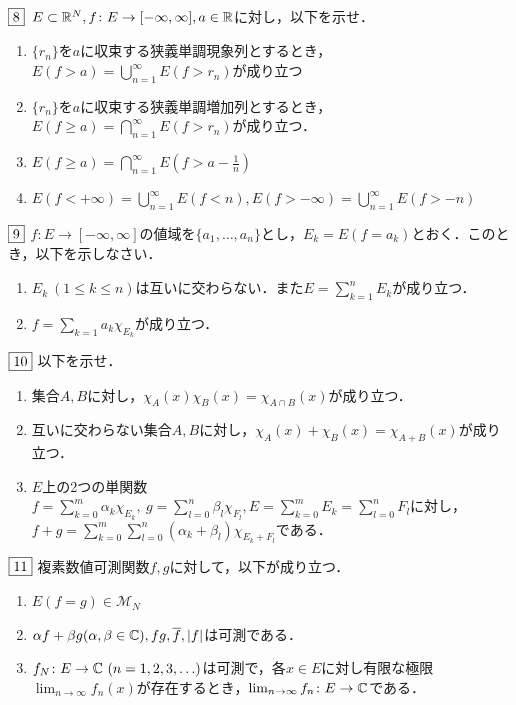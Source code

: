 \documentclass[dvipdfmx, leqno]{jsreport}
\begin{document}
\begin{tcolorbox}$\fbox{8}$
    $E\subset \mathbb{R}^N, f\colon E\to [-\infty, \infty], a\in \mathbb{R}$に対し，以下を示せ．
\begin{enumerate}
    \item $\{r_n\}$を$a$に収束する狭義単調現象列とするとき，$E(f> a)= \bigcup_{n= 1}^\infty E(f> r_n)$が成り立つ
    \item $\{r_n\}$を$a$に収束する狭義単調増加列とするとき，$E(f\ge a)= \bigcap_{n= 1}^\infty E(f> r_n)$が成り立つ．
    \item $E(f\ge a)= \bigcap_{n= 1}^\infty E\left(f> a- \frac{1}{n}\right)$
    \item $E(f< +\infty)= \bigcup_{n= 1}^\infty E(f< n), E(f> -\infty)= \bigcup_{n= 1}^\infty E(f> -n)$
\end{enumerate}
\end{tcolorbox}
\begin{tcolorbox}$\fbox{9}$
    $f\colon E\to [-\infty, \infty]$の値域を$\{a_1, \ldots, a_n\}$とし，$E_k= E(f= a_k)$とおく．このとき，以下を示しなさい．
\begin{enumerate}
    \item $E_k\ (1\le k\le n)$は互いに交わらない．また$E= \sum_{k= 1}^n E_k$が成り立つ．
    \item $f= \sum_{k= 1}a_k\chi_{E_k}$が成り立つ．
\end{enumerate}
\end{tcolorbox}
\begin{tcolorbox}$\fbox{10}$
    以下を示せ．
\begin{enumerate}
    \item 集合$A, B$に対し，$\chi_A(x)\chi_B(x)= \chi_{A\cap B}(x)$が成り立つ．
    \item 互いに交わらない集合$A, B$に対し，$\chi_A(x)+ \chi_B(x)=\chi_{A+ B}(x)$が成り立つ．
    \item $E$上の2つの単関数$f= \sum_{k= 0}^m \alpha_k \chi_{E_k},\ g= \sum_{l= 0}^n \beta_l\chi_{F_l}, E= \sum_{k= 0}^m E_k= \sum_{l= 0}^n F_l$に対し，$f+ g= \sum_{k= 0}^m\sum_{l= 0}^n (\alpha_k+ \beta_l)\chi_{E_k+ F_l}$である．
\end{enumerate}
\end{tcolorbox}
\begin{tcolorbox}$\fbox{11}$
    複素数値可測関数$f, g$に対して，以下が成り立つ．
\begin{enumerate}
    \item $E(f= g)\in \mathcal{M}_N$
    \item $\alpha f+ \beta g(\alpha, \beta\in \mathbb{C}), fg, \overline{f}, |f|$は可測である．
    \item $f_N\colon E\to \mathbb{C}\ (n= 1, 2, 3, \ldots)$は可測で，各$x\in E$に対し有限な極限$\lim_{n\to \infty} f_n(x)$が存在するとき，$\lim_{n\to \infty} f_n\colon E\to \mathbb{C}$である．
\end{enumerate}
\end{tcolorbox}
\end{document}
